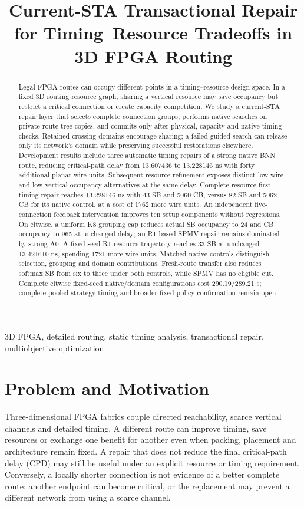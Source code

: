 \documentclass[conference,10pt]{IEEEtran}
\title{Current-STA Transactional Repair for Timing--Resource Tradeoffs in 3D FPGA Routing}
\author{\IEEEauthorblockN{Anonymous development manuscript}}
\begin{document}
\maketitle
\begin{abstract}
Legal FPGA routes can occupy different points in a timing--resource design space. In a fixed 3D routing resource graph, sharing a vertical resource may save occupancy but restrict a critical connection or create capacity competition. We study a current-STA repair layer that selects complete connection groups, performs native searches on private route-tree copies, and commits only after physical, capacity and native timing checks. Retained-crossing domains encourage sharing; a failed guided search can release only its network's domain while preserving successful restorations elsewhere. Development results include three automatic timing repairs of a strong native BNN route, reducing critical-path delay from 13.607436 to 13.228146 ns with forty additional planar wire units. Subsequent resource refinement exposes distinct low-wire and low-vertical-occupancy alternatives at the same delay. Complete resource-first timing repair reaches 13.228146 ns with 43 SB and 5060 CB, versus 82 SB and 5062 CB for its native control, at a cost of 1762 more wire units. An independent five-connection feedback intervention improves ten setup components without regressions. On eltwise, a uniform K8 grouping cap reduces actual SB occupancy to 24 and CB occupancy to 965 at unchanged delay; an R1-based SPMV repair remains dominated by strong A0. A fixed-seed R1 resource trajectory reaches 33 SB at unchanged 13.421610 ns, spending 1721 more wire units. Matched native controls distinguish selection, grouping and domain contributions. Fresh-route transfer also reduces softmax SB from six to three under both controls, while SPMV has no eligible cut. Complete eltwise fixed-seed native/domain configurations cost 290.19/289.21 s; complete pooled-strategy timing and broader fixed-policy confirmation remain open.
\end{abstract}
\begin{IEEEkeywords}
3D FPGA, detailed routing, static timing analysis, transactional repair, multiobjective optimization
\end{IEEEkeywords}

\section{Problem and Motivation}
Three-dimensional FPGA fabrics couple directed reachability, scarce vertical channels and detailed timing. A different route can improve timing, save resources or exchange one benefit for another even when packing, placement and architecture remain fixed. A repair that does not reduce the final critical-path delay (CPD) may still be useful under an explicit resource or timing requirement. Conversely, a locally shorter connection is not evidence of a better complete route: another endpoint can become critical, or the replacement may prevent a different network from using a scarce channel.
\end{document}
